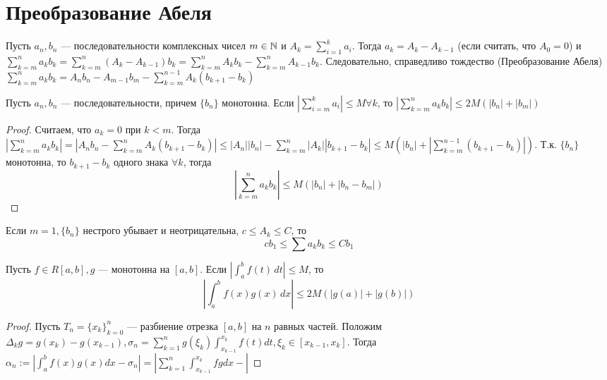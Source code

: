 
\section{Преобразование Абеля}
Пусть $a_n, b_n$ --- последовательности комплексных чисел $m \in \mathbb{N}$ и $A_k = \sum_{i = 1}^{k} a_i$. Тогда $a_k = A_k - A_{k-1}$ (если считать, что $A_0 = 0$) и $\sum_{k = m}^{n}a_kb_k = \sum_{k = m}^{n}(A_k - A_{k-1})b_k = \sum_{k = m}^{n}A_kb_k - \sum_{k = m}^{n}A_{k-1}b_k$.
Следовательно, справедливо тождество (Преобразование Абеля) $\sum_{k = m}^{n}a_kb_k = A_nb_n - A_{m-1}b_m - \sum_{k = m}^{n - 1}A_k(b_{k+1} - b_k)$
\begin{lemma}[Абеля]
    Пусть $a_n, b_n$ --- последовательности, причем $\{b_n\}$ монотонна. Если $\left\lvert \sum_{i = m}^k a_i\right\rvert \le M \forall k$, то $\left\lvert \sum_{k = m}^{n}a_kb_k\right\rvert \le 2M(|b_n| + |b_m|)$
\end{lemma}
\begin{proof}
    Считаем, что $a_k = 0$ при $k < m$. Тогда $\left\lvert \sum_{k = m}^{n}a_kb_k\right\rvert = \left\lvert A_nb_n - \sum_{k = m}^{n}A_k(b_{k+1} - b_k)\right\rvert \le |A_n||b_n| - \sum_{k = m}^{n}|A_k||b_{k+1} - b_k| \le M(|b_n| + \left\lvert \sum_{k = m}^{n-1}(b_{k+1} - b_k)\right\rvert )$. Т.к. $\{b_n\}$ монотонна, то $b_{k+1} - b_k$ одного знака $\forall k$, тогда 
    $$\left\lvert \sum_{k = m}^{n}a_kb_k\right\rvert \le M(|b_n| + |b_n - b_{m}|)$$
\end{proof}

\begin{note}
    Если $m = 1, \{b_n\}$ нестрого убывает и неотрицательна, $c \le A_k \le C$, то 
    $$cb_1 \le \sum a_kb_k \le Cb_1$$
\end{note}

\begin{lemma}[Абель]
    Пусть $f \in R[a, b], g$ --- монотонна на $[a, b]$. Если  $\left\lvert \int_{a}^{b} f(t) \,dt\right\rvert \le M$, то 
    $$\left\lvert \int_{a}^{b} f(x)g(x) \,dx\right\rvert  \le 2M(|g(a)| + |g(b)|)$$
\end{lemma}
\begin{proof}
    Пусть $T_n = \{x_k\}_{k = 0}^n$ --- разбиение отрезка $[a, b]$ на $n$ равных частей. Положим $\Delta_kg = g(x_k) - g(x_{k-1}), \sigma_n = \sum_{k = 1}^{n} g(\xi_k)\int_{x_{k-1}}^{x_k}f(t)dt, \xi_k \in [x_{k-1}, x_k]$. 
    Тогда $\alpha_n := \left\lvert \int_{a}^{b}f(x)g(x)dx - \sigma_n\right\rvert = \left\lvert \sum_{k = 1}^n \int_{x_{k-1}}^{x_k}fgdx - \right\rvert $
\end{proof}